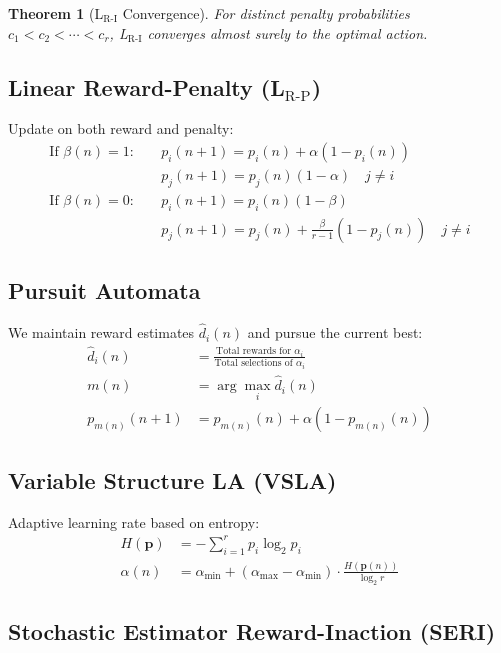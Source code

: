 \documentclass[11pt,a4paper]{article}
\newtheorem{theorem}{Theorem}
\begin{document}
\begin{theorem}[L$_{\text{R-I}}$ Convergence]
For distinct penalty probabilities $c_1 < c_2 < \cdots < c_r$, L$_{\text{R-I}}$ converges almost surely to the optimal action.
\end{theorem}

\subsection{Linear Reward-Penalty (L$_{\text{R-P}}$)}

Update on both reward and penalty:
\begin{align}
\text{If } \beta(n) = 1: \quad & p_i(n+1) = p_i(n) + \alpha(1 - p_i(n)) \\
& p_j(n+1) = p_j(n)(1 - \alpha) \quad j \neq i \\
\text{If } \beta(n) = 0: \quad & p_i(n+1) = p_i(n)(1 - \beta) \\
& p_j(n+1) = p_j(n) + \frac{\beta}{r-1}(1 - p_j(n)) \quad j \neq i
\end{align}

\subsection{Pursuit Automata}

We maintain reward estimates $\hat{d}_i(n)$ and pursue the current best:
\begin{align}
\hat{d}_i(n) &= \frac{\text{Total rewards for } \alpha_i}{\text{Total selections of } \alpha_i} \\
m(n) &= \arg\max_i \hat{d}_i(n) \\
p_{m(n)}(n+1) &= p_{m(n)}(n) + \alpha(1 - p_{m(n)}(n))
\end{align}

\subsection{Variable Structure LA (VSLA)}

Adaptive learning rate based on entropy:
\begin{align}
H(\mathbf{p}) &= -\sum_{i=1}^{r} p_i \log_2 p_i \\
\alpha(n) &= \alpha_{\min} + (\alpha_{\max} - \alpha_{\min}) \cdot \frac{H(\mathbf{p}(n))}{\log_2 r}
\end{align}

\subsection{Stochastic Estimator Reward-Inaction (SERI)}
\end{document}
